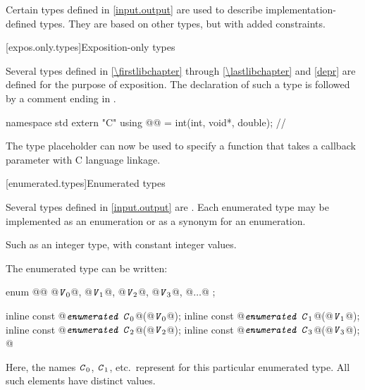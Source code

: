 \pnum
Certain types defined in \ref{input.output} are used to describe implementation-defined types.
%
They are based on other types, but with added constraints.

[expos.only.types]{Exposition-only types}

\pnum
Several types defined in \ref{\firstlibchapter} through \ref{\lastlibchapter}
and \ref{depr} are defined for the purpose of exposition.
The declaration of such a type is followed by a comment ending in \expos.
\begin{example}
\begin{codeblock}
namespace std {
  extern "C" using @@ = int(int, void*, double);  // \expos
}
\end{codeblock}
The type placeholder  can now be used to specify a function
that takes a callback parameter with C language linkage.
\end{example}

[enumerated.types]{Enumerated types}

\pnum
Several types defined in \ref{input.output} are
.
Each enumerated type may be implemented as an enumeration or as a synonym for
an enumeration.
\begin{footnote}
Such as an integer type, with constant integer
values.
\end{footnote}

\pnum
The enumerated type  can be written:

\begin{codeblock}
enum @@ { @$\texttt{\textit{V}}_{0}$@, @$\texttt{\textit{V}}_{1}$@, @$\texttt{\textit{V}}_{2}$@, @$\texttt{\textit{V}}_{3}$@, @$\ldots$@ };

inline const @$\texttt{\textit{enumerated C}}_{0}$@(@$\texttt{\textit{V}}_{0}$@);
inline const @$\texttt{\textit{enumerated C}}_{1}$@(@$\texttt{\textit{V}}_{1}$@);
inline const @$\texttt{\textit{enumerated C}}_{2}$@(@$\texttt{\textit{V}}_{2}$@);
inline const @$\texttt{\textit{enumerated C}}_{3}$@(@$\texttt{\textit{V}}_{3}$@);
  @\vdots@
\end{codeblock}

\pnum
Here, the names $\texttt{\textit{C}}_0$,
$\texttt{\textit{C}}_1$, etc.\ represent
for this particular enumerated type.
%
All such elements have distinct values.

